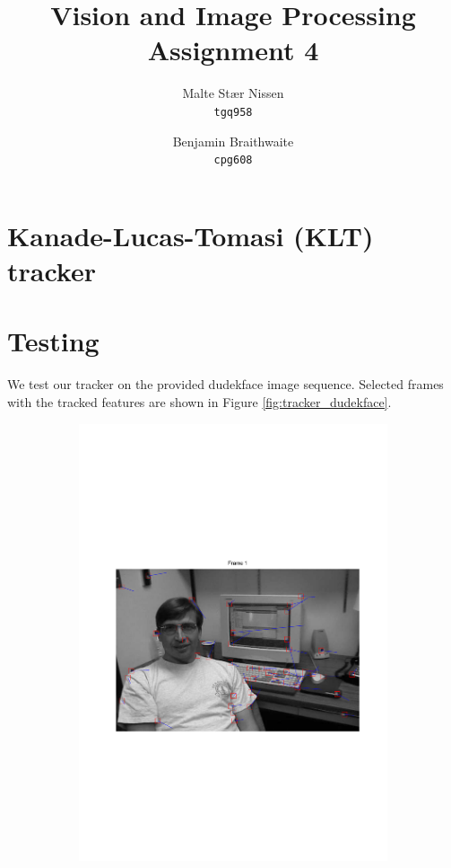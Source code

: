 \documentclass[11pt,a4paper]{article}
\title{Vision and Image Processing\\Assignment 4}
\author{Malte Stær Nissen    \\ \texttt{tgq958} \and
        Benjamin Braithwaite \\ \texttt{cpg608}}
\begin{document}
\maketitle

\section{Kanade-Lucas-Tomasi (KLT) tracker}

\section{Testing}
%
We test our tracker on the provided dudekface image sequence. Selected frames with the tracked features are shown in Figure \ref{fig:tracker_dudekface}.
%
\begin{figure}[H]
\centering
\begin{subfigure}{0.45\textwidth}
\includegraphics[scale=0.4,trim={120 250 0 250}]{img/tracker_dudekface_1.pdf}

\end{subfigure}
\end{figure}
\end{document}
